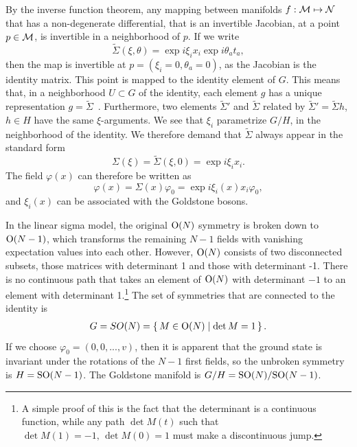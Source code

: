 By the inverse function theorem, any mapping between manifolds $f: \mathcal{M} \mapsto \mathcal{N}$ that has a non-degenerate differential, that is an invertible Jacobian, at a point $p \in \mathcal{M}$, is invertible in a neighborhood of $p$.
If we write
%
\begin{equation}
    \tilde \Sigma(\xi, \theta) = \exp{i \xi_i x_i} \exp{i \theta_a t_a},
\end{equation}
%
then the map is invertible at $p = (\xi_i = 0, \theta_a = 0)$, as the Jacobian is the identity matrix.
This point is mapped to the identity element of $G$.
This means that, in a neighborhood $U \subset G$ of the identity, each element $g$ has a unique representation $g = \tilde \Sigma$~\autocite{leeIntroductionSmoothManifolds2003d}.
Furthermore, two elements $\tilde \Sigma'$ and $\tilde \Sigma$ related by $\tilde \Sigma' = \tilde \Sigma h$, $h \in H$ have the same $\xi$-arguments.
We see that $\xi_i$ parametrize $G/H$, in the neighborhood of the identity.
We therefore demand that $\tilde \Sigma$ always appear in the standard form
%
\begin{equation}
    \Sigma(\xi) = \tilde \Sigma(\xi, 0) = \exp{i \xi_i x_i}.
\end{equation}
%
The field $\varphi(x)$ can therefore be written as
%
\begin{equation}
    \varphi(x) = \Sigma(x) \varphi_0 = \exp{i \xi_i(x) x_i} \varphi_0,
\end{equation}
%
and $\xi_i(x)$ can be associated with the Goldstone bosons.

In the linear sigma model, the original $\text O(N)$ symmetry is broken down to $\text O(N-1)$, which transforms the remaining $N-1$ fields with vanishing expectation values into each other.
However, $\text O(N)$ consists of two disconnected subsets, those matrices with determinant 1 and those with determinant -1.
There is no continuous path that takes an element of $\text O(N)$ with determinant $-1$ to an element with determinant 1.\footnote{
    A simple proof of this is the fact that the determinant is a continuous function, while any path $\det M(t)$ such that $\det M(1) = -1,\, \det M(0) = 1$ must make a discontinuous jump.}
The set of symmetries that are connected to the identity is
%
\begin{eqnarray}
    G = SO(N) = \left\{\, M \in \text O(N) \mid  \det M = 1 \,\right\}.
\end{eqnarray}
%
If we choose $\varphi_0 = (0, 0, ..., v)$, then it is apparent that the ground state is invariant under the rotations of the $N-1$ first fields, so the unbroken symmetry is  $H = \text{SO}(N-1)$.
The Goldstone manifold is $G/H = \text{SO}(N) / \text{SO}(N-1)$.

